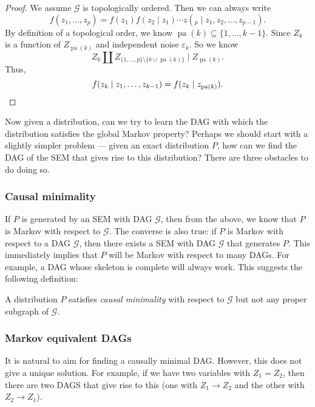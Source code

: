 \documentclass[a4paper]{article}
\DeclareMathOperator\pa{pa}
\begin{document}
\begin{proof}
  We assume $\mathcal{G}$ is topologically ordered. %
  Then we can always write
  \[
    f(z_1, \ldots, z_p) = f(z_1) f(z_2 \mid z_1) \cdots z(_p \mid z_1, z_2, \ldots, z_{p - 1}).
  \]
  By definition of a topological order, we know $\pa(k) \subseteq \{1, \ldots, k - 1\}$. Since $Z_k$ is a function of $Z_{\pa(k)}$ and independent noise $\varepsilon_k$. So we know
  \[
    Z_{k} \amalg Z_{\{1, \ldots, p\} \setminus \{k \cup \pa(k)\}} \mid Z_{\pa(k)}.
  \]
  Thus,
  \[
    f(z_{k} \mid z_1, \ldots, z_{k - 1}) = f(z_k \mid z_{\pa(k)}).\qedhere
  \]
\end{proof}

Now given a distribution, can we try to learn the DAG with which the distribution satisfies the global Markov property? Perhaps we should start with a slightly simpler problem --- given an exact distribution $P$, how can we find the DAG of the SEM that gives rise to this distribution? There are three obstacles to do doing so.

\subsubsection*{Causal minimality}
If $P$ is generated by an SEM with DAG $\mathcal{G}$, then from the above, we know that $P$ is Markov with respect to $\mathcal{G}$. The converse is also true: if $P$ is Markov with respect to a DAG $\mathcal{G}$, then there exists a SEM with DAG $\mathcal{G}$ that generates $P$. This immediately implies that $P$ will be Markov with respect to many DAGs. For example, a DAG whose skeleton is complete will always work. This suggests the following definition:

\begin{defi}
  A distribution $P$ satisfies \emph{causal minimality} with respect to $\mathcal{G}$ but not any proper subgraph of $\mathcal{G}$.
\end{defi}

\subsubsection*{Markov equivalent DAGs}

It is natural to aim for finding a causally minimal DAG. However, this does not give a unique solution. For example, if we have two variables with $Z_1 = Z_2$, then there are two DAGS that give rise to this (one with $Z_1 \to Z_2$ and the other with $Z_2 \to Z_1$).
\end{document}
